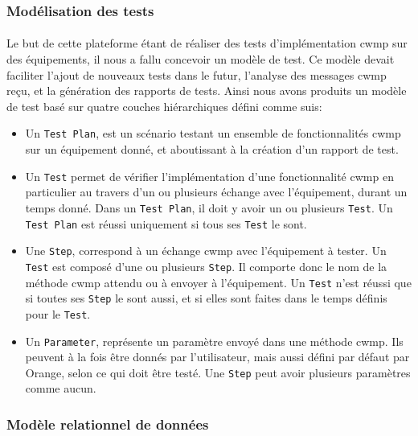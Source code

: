 \documentclass[12pt,a4paper]{report}
\begin{document}
\subsubsection{Modélisation des tests}
\paragraph*{}Le but de cette plateforme étant de réaliser des tests d'implémentation \gls{cwmp} sur des équipements, il nous a fallu concevoir un modèle de test. Ce modèle devait faciliter l'ajout de nouveaux tests dans le futur, l'analyse des messages \gls{cwmp} reçu, et la génération des rapports de tests. Ainsi nous avons produits un modèle de test basé sur quatre couches hiérarchiques défini comme suis: 
\begin{itemize}
\item Un \texttt{Test Plan}, est un scénario testant un ensemble de fonctionnalités \gls{cwmp} sur un équipement donné, et aboutissant à la création d'un rapport de test.
\item Un \texttt{Test} permet de vérifier l'implémentation d'une fonctionnalité \gls{cwmp} en particulier au travers d'un ou plusieurs échange avec l'équipement, durant un temps donné. Dans un \texttt{Test Plan}, il doit y avoir un ou plusieurs \texttt{Test}. Un \texttt{Test Plan} est réussi uniquement si tous ses \texttt{Test} le sont.
\item Une \texttt{Step}, correspond à un échange \gls{cwmp} avec l'équipement à tester. Un \texttt{Test} est composé d'une ou plusieurs \texttt{Step}. Il comporte donc le nom de la méthode \gls{cwmp} attendu ou à envoyer à l'équipement. Un \texttt{Test} n'est réussi que si toutes ses \texttt{Step} le sont aussi, et si elles sont faites dans le temps définis pour le \texttt{Test}.
\item Un \texttt{Parameter}, représente un paramètre envoyé dans une méthode \gls{cwmp}. Ils peuvent à la fois être donnés par l'utilisateur, mais aussi défini par défaut par Orange, selon ce qui doit être testé. Une \texttt{Step} peut avoir plusieurs paramètres comme aucun. \\
\end{itemize} 
\subsubsection{Modèle relationnel de données}
\end{document}
